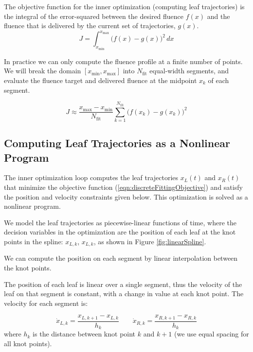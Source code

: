 \documentclass[12pt]{article}
\begin{document}
The objective function for the inner optimization (computing leaf trajectories)
is the integral of the error-squared between the desired fluence $f(x)$ and the fluence that
is delivered by the current set of trajectories, $g(x)$.
\begin{equation}
  J = \int_{x_\text{min}}^{x_\text{max}} \! \bigg( f(x) - g(x) \bigg)^2 \,dx
  \label{eqn:continuousFittingObjective}
\end{equation}

In practice we can only compute the fluence profile at a finite number of points. We will break the domain $[x_\text{min}, x_\text{max}]$ into $N_\text{fit}$ equal-width segments,
and evaluate the fluence target and delivered fluence at the midpoint $x_k$ of each segment.

\begin{equation}
  J \approx \frac{x_\text{max} - x_\text{min}}{N_\text{fit}}
  \sum_{k = 1}^{N_\text{fit}} \! \bigg( f(x_k) - g(x_k) \bigg)^2
  \label{eqn:discreteFittingObjective}
\end{equation}

\subsection{Computing Leaf Trajectories as a Nonlinear Program}
\label{sec:LeafTrajectoryAsNLP}

The inner optimization loop computes the leaf trajectories $x_L(t)$ and $x_R(t)$
that minimize the objective function (\ref{eqn:discreteFittingObjective})
and satisfy the position and velocity constraints given below.
This optimization is solved as a nonlinear program.

We model the leaf trajectories as piecewise-linear functions of time,
where the decision variables in the optimization are the position of each leaf
at the knot points in the spline: $x_{L, k}$, $x_{L, k}$, as shown in Figure \ref{fig:linearSpline}.

We can compute the position on each segment by linear interpolation between the knot points.

The position of each leaf is linear over a single segment, thus the velocity of the leaf on that segment is constant,
with a change in value at each knot point.
The velocity for each segment is:

\begin{equation}
  \dot{x}_{L, k} = \frac{x_{L, k+1} - x_{L, k}}{h_k}
  \quad \quad
  \dot{x}_{R, k} = \frac{x_{R, k+1} - x_{R, k}}{h_k}
\end{equation}
\noindent where $h_k$ is the distance between knot point $k$ and $k+1$ (we use equal spacing for all knot points).
\end{document}
